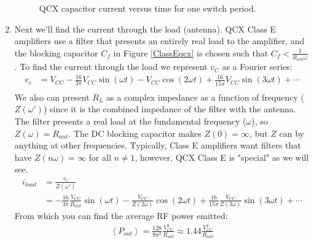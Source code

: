 \documentclass[10pt,letterpaper]{article}
\begin{document}
\begin{enumerate}
\begin{figure}
\centering
{}
\caption{QCX capacitor current versus time for one switch period.}
\label{QCXicplot}
\end{figure}

\item Next we'll find the current through the load (antenna). QCX Class E amplifiers use a filter that presents an entirely real load to the amplifier, and the blocking capacitor $C_f$ in Figure \ref{ClassEqcx} is chosen such that $C_f < \frac{1}{R_{ant}\omega}$. To find the current through the load we represent $v_C$ as a Fourier series:
\begin{align*}
v_c &= V_{CC}-\frac{ 16}{3\pi}V_{CC}\sin(\omega t)-V_{CC}\cos(2\omega t) + \frac{ 16}{15\pi}V_{CC}\sin(3\omega t)+\cdots\\
\end{align*}
We also can present $R_L$ as a complex impedance as a function of frequency ($Z(\omega')$) since it is the combined impedance of the filter with the antenna. The filter presents a real load at the fundamental frequency ($\omega$), so $Z(\omega)=R_{ant}$. The DC blocking capacitor makes $Z(0)=\infty$, but $Z$ can by anything at other frequencies. Typically, Class E amplifiers want filters that have $Z(n\omega)=\infty$ for all $n\neq 1$, however, QCX Class E is "special" as we will see.
\begin{align*}
i_{load}&=\frac{v_c}{Z(\omega')}\\
&= -\frac{ 16}{3\pi}\frac{ V_{CC}}{R_{ant}} \sin(\omega t)-\frac{V_{CC}}{Z(2\omega)}\cos(2\omega t) + \frac{ 16}{15\pi}\frac{V_{CC}}{Z(3\omega)}\sin(3\omega t)+\cdots
\end{align*}
From which you can find the average RF power emitted:
\begin{align*}
\left\langle P_{out} \right\rangle = \frac{ 128}{9\pi^2} \frac{ V_{CC}^2}{R_{ant}}\approx 1.44\frac{ V_{CC}^2}{R_{ant}}
\end{align*}


\end{enumerate}
\end{document}
